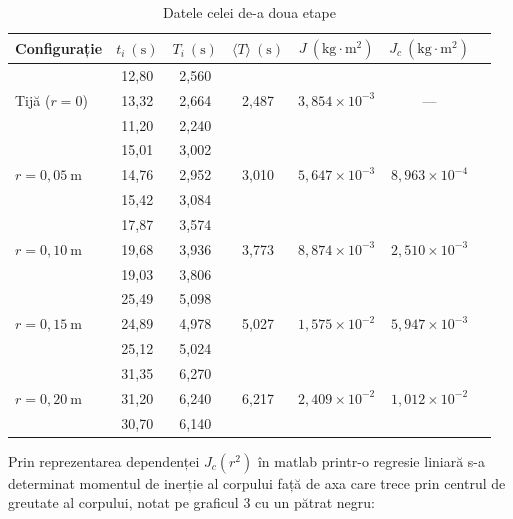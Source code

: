 \documentclass[a4paper,12pt]{article}
\begin{document}
\begin{table}[h!]
\centering
\label{tab:inertie}
\setlength{\tabcolsep}{6pt}
\begin{tabular}{lcccccc}
\toprule
Configurație & $t_i\ \mathrm{(s)}$ & $T_i\ \mathrm{(s)}$ & $\langle T \rangle\ \mathrm{(s)}$ & $J\ \mathrm{(kg\cdot m^2)}$ & $J_c\ \mathrm{(kg\cdot m^2)}$ \\
\midrule
\multirow{3}{*}{Tijă ($r = 0$)}
  & 12{,}80 & 2{,}560 & \multirow{3}{*}{2{,}487} & \multirow{3}{*}{$3{,}854\times10^{-3}$} & \multirow{3}{*}{—} \\
  & 13{,}32 & 2{,}664 & & & \\
  & 11{,}20 & 2{,}240 & & & \\
\midrule
\multirow{3}{*}{$r = 0{,}05\ \mathrm{m}$}
  & 15{,}01 & 3{,}002 & \multirow{3}{*}{3{,}010} & \multirow{3}{*}{$5{,}647\times10^{-3}$} & \multirow{3}{*}{$8{,}963\times10^{-4}$} \\
  & 14{,}76 & 2{,}952 & & & \\
  & 15{,}42 & 3{,}084 & & & \\
\midrule
\multirow{3}{*}{$r = 0{,}10\ \mathrm{m}$}
  & 17{,}87 & 3{,}574 & \multirow{3}{*}{3{,}773} & \multirow{3}{*}{$8{,}874\times10^{-3}$} & \multirow{3}{*}{$2{,}510\times10^{-3}$} \\
  & 19{,}68 & 3{,}936 & & & \\
  & 19{,}03 & 3{,}806 & & & \\
\midrule
\multirow{3}{*}{$r = 0{,}15\ \mathrm{m}$}
  & 25{,}49 & 5{,}098 & \multirow{3}{*}{5{,}027} & \multirow{3}{*}{$1{,}575\times10^{-2}$} & \multirow{3}{*}{$5{,}947\times10^{-3}$} \\
  & 24{,}89 & 4{,}978 & & & \\
  & 25{,}12 & 5{,}024 & & & \\
\midrule
\multirow{3}{*}{$r = 0{,}20\ \mathrm{m}$}
  & 31{,}35 & 6{,}270 & \multirow{3}{*}{6{,}217} & \multirow{3}{*}{$2{,}409\times10^{-2}$} & \multirow{3}{*}{$1{,}012\times10^{-2}$} \\
  & 31{,}20 & 6{,}240 & & & \\
  & 30{,}70 & 6{,}140 & & & \\
\bottomrule
\end{tabular}
  \caption{Datele celei de-a doua etape}
\end{table}
\newpage

\indent Prin reprezentarea dependenței $J_c(r^2)$ în matlab printr-o regresie liniară s-a determinat momentul de inerție al corpului față de axa care trece prin centrul de greutate al corpului, notat pe graficul 3 cu un pătrat negru:
\end{document}
